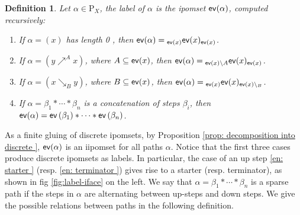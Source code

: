 \documentclass[11pt,a4paper,oldfontcommands]{memoir}
\newcommand*\ev{\textup{\textsf{ev}}}
\newtheorem{definition}{Definition}
\begin{document}
\begin{definition}
     Let $\alpha \in \mathrm{P}_{X}$, the label of $\alpha$ is the ipomset $\ev(\alpha)$, computed recursively:

\begin{enumerate}
 

  \item \label{en: one cell} If $\alpha=(x)$ has length 0 , then $\ev(\alpha)={ }_{\ev(x)} \ev(x)_{\ev(x)}$.

  \item \label{en: starter } If $\alpha=\left(y \nearrow^{A}  x \right)$, where $A \subseteq \ev(x)$, then $\ev(\alpha)={}_{ \ev(x) \setminus A} \ev(x)_{\ev(x)}$.

  \item \label{en: terminator } If $\alpha=(x \searrow_B y)$, where $B \subseteq \ev(x)$, then $\ev(\alpha)={ }_{\ev(x)} \ev(x)_{\ev(x) \backslash_B}$.

  \item \label{en : label gluing} If $\alpha=\beta_{1} * \cdots * \beta_{n}$ is a concatenation of steps $\beta_{i}$, then $\ev(\alpha)=\ev\left(\beta_{1}\right) * \cdots * \ev\left(\beta_{n}\right)$.
\end{enumerate}
\end{definition}
As a finite gluing of discrete ipomsets, by Proposition \ref{prop: decomposition into discrete }, $\ev(\alpha)$ is an iipomset for all paths $\alpha$. Notice that the first three cases produce discrete ipomsets as labels. In particular, the case of an up step \ref{en: starter } (resp. \ref{en: terminator })  gives rise to a starter (resp. terminator), as shown in fig \ref{fig:label-iface} on the left.
 We say that $\alpha=\beta_{1} * \cdots * \beta_{n}$ is a sparse path if the steps in $\alpha$ are alternating between up-steps and down steps. We give the possible relations between paths in the following definition.
\end{document}
